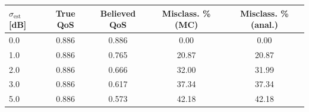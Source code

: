\begin{tabular}{lcccc}
\hline
$\sigma_{\text{est}}$ [dB] & \textbf{True QoS} & \textbf{Believed QoS} & \textbf{Misclass. \% (MC)} & \textbf{Misclass. \% (anal.)} \\
\hline
0.0 & 0.886 & 0.886 & 0.00 & 0.00 \\
1.0 & 0.886 & 0.765 & 20.87 & 20.87 \\
2.0 & 0.886 & 0.666 & 32.00 & 31.99 \\
3.0 & 0.886 & 0.617 & 37.34 & 37.34 \\
5.0 & 0.886 & 0.573 & 42.18 & 42.18 \\
\hline
\end{tabular}
